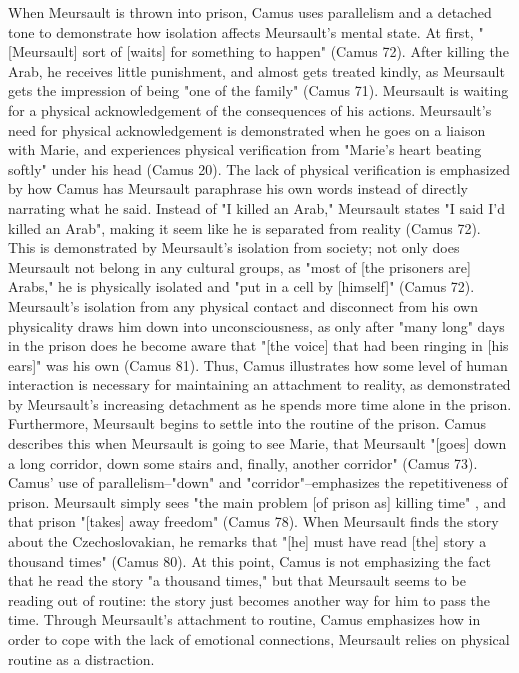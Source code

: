 \documentclass[12pt,a4paper]{article}
\begin{document}
    When Meursault is thrown into prison,
    Camus uses parallelism and a detached tone to demonstrate how isolation
    affects Meursault's mental state. At first, "[Meursault] sort of [waits]
    for something to happen" (Camus 72). After killing the Arab, he receives
    little punishment, and almost gets treated kindly, as Meursault gets the
    impression of being "one of the family" (Camus 71). Meursault is waiting
    for a physical acknowledgement of the consequences of his actions.
    Meursault's need for physical acknowledgement is
    demonstrated when he goes on a liaison with Marie, and experiences
    physical verification from "Marie's heart beating softly" under his
    head (Camus 20). The lack of physical verification is emphasized by how
    Camus has Meursault paraphrase his own words instead of directly
    narrating what he said. Instead of "I killed an Arab," Meursault states
    "I said I'd killed an Arab", making it seem like he is
    separated from reality (Camus 72). This is demonstrated by Meursault's isolation
    from society; not only does Meursault not belong in any cultural groups,
    as "most of [the prisoners are] Arabs," he is physically isolated and
    "put in a cell by [himself]" (Camus 72). Meursault's isolation from any
    physical contact and disconnect from his own physicality draws him down
    into unconsciousness, as only after "many long" days in the prison does
    he become aware that "[the voice] that had been ringing in [his ears]"
    was his own (Camus 81). Thus, Camus illustrates how some level of human
    interaction is necessary for maintaining an attachment to reality, as
    demonstrated by Meursault's increasing detachment as he spends more time
    alone in the prison. Furthermore, Meursault begins to settle into the
    routine of the prison. Camus describes this when Meursault is going to
    see Marie, that Meursault "[goes] down a long corridor, down some stairs
    and, finally, another corridor" (Camus 73). Camus' use of
    parallelism--"down" and "corridor"--emphasizes the repetitiveness of
    prison. Meursault simply sees "the main problem [of prison as] killing
    time" , and that prison "[takes] away freedom" (Camus 78). When
    Meursault finds the story about the Czechoslovakian, he remarks that
    "[he] must have read [the] story a thousand times" (Camus 80). At this
    point, Camus is not emphasizing the fact that he read the story "a
    thousand times," but that Meursault seems to be reading out of routine:
    the story just becomes another way for him to pass the time. Through
    Meursault's attachment to routine, Camus emphasizes how in order to cope
    with the lack of emotional connections, Meursault relies on physical
    routine as a distraction. \\
\end{document}
